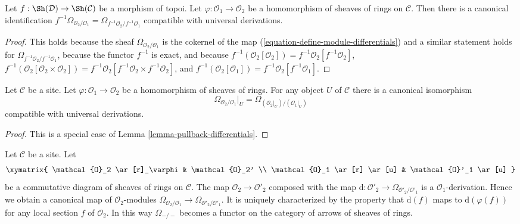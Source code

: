 \begin{lemma}
\label{lemma-pullback-differentials}
Let $f : \Sh(\mathcal{D}) \to \Sh(\mathcal{C})$ be a morphism of topoi.
Let $\varphi : \mathcal{O}_1 \to \mathcal{O}_2$
be a homomorphism of sheaves of rings on $\mathcal{C}$.
Then there is a canonical identification
$f^{-1}\Omega_{\mathcal{O}_2/\mathcal{O}_1} =
\Omega_{f^{-1}\mathcal{O}_2/f^{-1}\mathcal{O}_1}$
compatible with universal derivations.
\end{lemma}

\begin{proof}
This holds because the sheaf $\Omega_{\mathcal{O}_2/\mathcal{O}_1}$
is the cokernel of the map (\ref{equation-define-module-differentials})
and a similar statement holds for
$\Omega_{f^{-1}\mathcal{O}_2/f^{-1}\mathcal{O}_1}$,
because the functor $f^{-1}$ is exact, and because
$f^{-1}(\mathcal{O}_2[\mathcal{O}_2]) =
f^{-1}\mathcal{O}_2[f^{-1}\mathcal{O}_2]$,
$f^{-1}(\mathcal{O}_2[\mathcal{O}_2 \times \mathcal{O}_2]) =
f^{-1}\mathcal{O}_2[f^{-1}\mathcal{O}_2 \times f^{-1}\mathcal{O}_2]$, and
$f^{-1}(\mathcal{O}_2[\mathcal{O}_1]) =
f^{-1}\mathcal{O}_2[f^{-1}\mathcal{O}_1]$.
\end{proof}

\begin{lemma}
\label{lemma-localize-differentials}
Let $\mathcal{C}$ be a site. Let $\varphi : \mathcal{O}_1 \to \mathcal{O}_2$
be a homomorphism of sheaves of rings. For any object $U$ of $\mathcal{C}$
there is a canonical isomorphism
$$
\Omega_{\mathcal{O}_2/\mathcal{O}_1}|_U =
\Omega_{(\mathcal{O}_2|_U)/(\mathcal{O}_1|_U)}
$$
compatible with universal derivations.
\end{lemma}

\begin{proof}
This is a special case of Lemma \ref{lemma-pullback-differentials}.
\end{proof}

\begin{lemma}
\label{lemma-functoriality-differentials}
Let $\mathcal{C}$ be a site. Let
$$
\xymatrix{
\mathcal{O}_2 \ar[r]_\varphi & \mathcal{O}_2' \\
\mathcal{O}_1 \ar[r] \ar[u] & \mathcal{O}'_1 \ar[u]
}
$$
be a commutative diagram of sheaves of rings on $\mathcal{C}$. The map
$\mathcal{O}_2 \to \mathcal{O}'_2$ composed with the map
$\text{d} : \mathcal{O}'_2 \to \Omega_{\mathcal{O}'_2/\mathcal{O}'_1}$
is a $\mathcal{O}_1$-derivation. Hence we obtain a canonical map of
$\mathcal{O}_2$-modules
$\Omega_{\mathcal{O}_2/\mathcal{O}_1} \to
\Omega_{\mathcal{O}'_2/\mathcal{O}'_1}$.
It is uniquely characterized by the property that
$\text{d}(f)$ maps to $\text{d}(\varphi(f))$
for any local section $f$ of $\mathcal{O}_2$.
In this way $\Omega_{-/-}$ becomes a functor on the category
of arrows of sheaves of rings.
\end{lemma}

